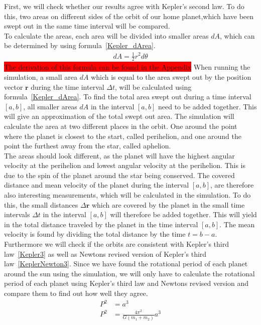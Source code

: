 \documentclass[reprint,english,notitlepage]{revtex4-2}
\begin{document}
First, we will check whether our results agree with Kepler's second law.
To do this, two areas on different sides of the orbit of our home planet,which have been swept out in the same time interval will be compared.\\
To calculate the areas, each area will be divided into smaller areas $dA$, which can be determined by using formula~\eqref{Kepler_dArea}.
\begin{align}
    dA = \frac{1}{2}r^2 d\theta \label{Kepler_dArea}
\end{align}
\colorbox{red}{The derivation of this formula can be found in the Appendix}
When running the simulation, a small area $dA$ which is equal to the area swept out by the position vector $\textbf{r}$ during the time interval $\Delta t$, will be calculated using formula~\eqref{Kepler_dArea}.
To find the total area swept out during a time interval $[a, b]$, all smaller areas $dA$ in the interval $[a, b]$ need to be added together.
This will give an approximation of the total swept out area.
The simulation will calculate the area at two different places in the orbit.
One around the point where the planet is closest to the start, called perihelion, and one around the point the furthest away from the star, called aphelion.\\
The areas should look different, as the planet will have the highest angular velocity at the perihelion and lowest angular velocity at the perihelion.
This is due to the spin of the planet around the star being conserved.
The covered distance and mean velocity of the planet during the interval $[a, b]$, are therefore also interesting measurements, which will be calculated in the simulation.
To do this, the small distances $\Delta \textbf{r}$ which are covered by the planet in the small time intervals $\Delta t$ in the interval $[a, b]$ will therefore be added together.
This will yield in the total distance traveled by the planet in the time interval $[a, b]$.
The mean velocity is found by dividing the total distance by the time $t = b-a$.\\

Furthermore we will check if the orbits are consistent with Kepler's third law~\eqref{Kepler3} as well as Newtons revised version of Kepler's third law~\eqref{KeplerNewton3}.
Since we have found the rotational period of each planet around the sun using the simulation, we will only have to calculate the rotational period of each planet using Kepler's third law and Newtons revised version and compare them to find out how well they agree.
\begin{align}
    P^2 &= a^3 \label{Kepler3}\\
	P^2 &= \frac{4 \pi^2}{G \left( m_1 + m_2 \right)} a^3 \label{KeplerNewton3}
\end{align}
\end{document}
